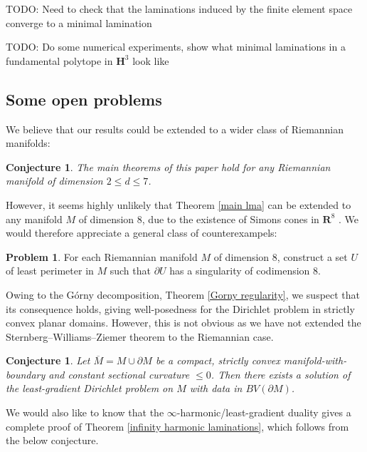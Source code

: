\documentclass[reqno,12pt,letterpaper]{amsart}
\newcommand{\RR}{\mathbf{R}}
\newcommand{\Hyp}{\mathbf H}
\newtheorem{conjecture}[theorem]{Conjecture}
\theoremstyle{definition}
\newtheorem{problem}[theorem]{Problem}
\numberwithin{equation}{section}
\begin{document}
TODO: Need to check that the laminations induced by the finite element space converge to a minimal lamination

TODO: Do some numerical experiments, show what minimal laminations in a fundamental polytope in $\Hyp^3$ look like



\subsection{Some open problems}
We believe that our results could be extended to a wider class of Riemannian manifolds:

\begin{conjecture}\label{main conj}
The main theorems of this paper hold for any Riemannian manifold of dimension $2 \leq d \leq 7$.
\end{conjecture}

However, it seems highly unlikely that Theorem \ref{main lma} can be extended to any manifold $M$ of dimension $8$, due to the existence of Simons cones in $\RR^8$ \cite[Theorem A]{BOMBIERI1969}.
We would therefore appreciate a general class of counterexampels:

\begin{problem}
For each Riemannian manifold $M$ of dimension $8$, construct a set $U$ of least perimeter in $M$ such that $\partial U$ has a singularity of codimension $8$.
\end{problem}

Owing to the G\'orny decomposition, Theorem \ref{Gorny regularity}, we suspect that its consequence \cite[Theorem 1.1]{górny2017planar} holds, giving well-posedness for the Dirichlet problem in strictly convex planar domains.
However, this is not obvious as we have not extended the Sternberg--Williams--Ziemer theorem \cite{ZiemerWilliamsSternberg1992} to the Riemannian case.

\begin{conjecture}
Let $\overline M = M \cup \partial M$ be a compact, strictly convex manifold-with-boundary and constant sectional curvature $\leq 0$.
Then there exists a solution of the least-gradient Dirichlet problem on $M$ with data in $BV(\partial M)$.
\end{conjecture}

We would also like to know that the $\infty$-harmonic/least-gradient duality gives a complete proof of Theorem \ref{infinity harmonic laminations}, which follows from the below conjecture.
\end{document}
